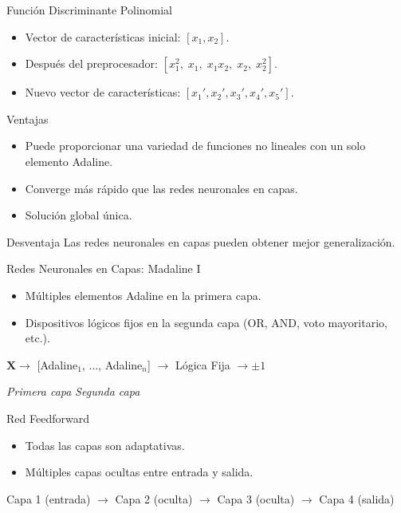 \documentclass[aspectratio=169,utf8,spanish]{beamer}
\begin{document}
\begin{frame}{Función Discriminante Polinomial}
  \begin{itemize}
    \item Vector de características inicial: $[x_1, x_2]$.
    \item Después del preprocesador: $[x_1^2,\; x_1,\; x_1x_2,\; x_2,\; x_2^2]$.
    \item Nuevo vector de características: $[x_1', x_2', x_3', x_4', x_5']$.
  \end{itemize}

  \begin{block}{Ventajas}
    \begin{itemize}
      \item Puede proporcionar una variedad de funciones no lineales con un solo elemento Adaline.
      \item Converge más rápido que las redes neuronales en capas.
      \item Solución global única.
    \end{itemize}
  \end{block}

  \begin{block}{Desventaja}
    Las redes neuronales en capas pueden obtener mejor generalización.
  \end{block}
\end{frame}

\begin{frame}{Redes Neuronales en Capas: Madaline I}
  \begin{itemize}
    \item Múltiples elementos Adaline en la primera capa.
    \item Dispositivos lógicos fijos en la segunda capa (OR, AND, voto mayoritario, etc.).
  \end{itemize}
  \begin{center}
    $\mathbf{X} \to$ [Adaline$_1$, $\ldots$, Adaline$_n$] $\to$ Lógica Fija $\to \pm 1$

    \small{\textit{Primera capa} \hspace{3cm} \textit{Segunda capa}}
  \end{center}
\end{frame}

\begin{frame}{Red Feedforward}
  \begin{itemize}
    \item Todas las capas son adaptativas.
    \item Múltiples capas ocultas entre entrada y salida.
  \end{itemize}
  \begin{center}
    Capa 1 (entrada) $\to$ Capa 2 (oculta) $\to$ Capa 3 (oculta) $\to$ Capa 4 (salida)
  \end{center}
\end{frame}
\end{document}
